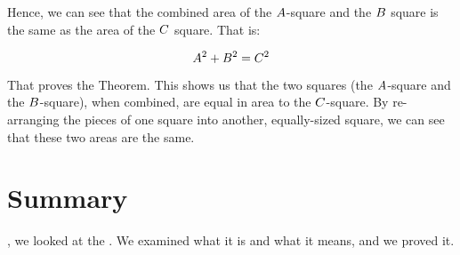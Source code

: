 \documentclass[../../../main.tex]{subfiles}
\begin{document}
Hence, we can see that the combined area of the $A$-square and the $B$ square is the same as the area of the $C$ square. That is:

\begin{equation*}
  A^{2} + B^{2} = C^{2}
\end{equation*}

That proves the Theorem. This shows us that the two squares (the $A$-square and the $B$-square), when combined, are equal in area to the $C$-square. By re-arranging the pieces of one square into another, equally-sized square, we can see that these two areas are the same.


\section{Summary}

, we looked at the . We examined what it is and what it means, and we proved it.
\end{document}

